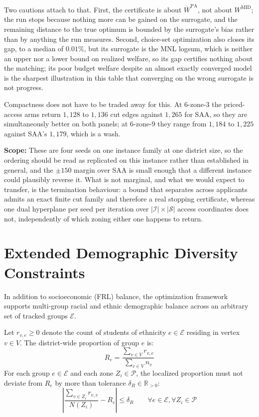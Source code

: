 \documentclass{article}
\begin{document}
Two cautions attach to that. First, the certificate is about $\overline{W}^{\mathrm{PA}}$, not about $W^{\mathrm{MID}}$; the run stops because nothing more can be gained on the surrogate, and the remaining distance to the true optimum is bounded by the surrogate's bias rather than by anything the run measures. Second, choice-set optimization also closes its gap, to a median of $0.01\%$, but its surrogate is the MNL logsum, which is neither an upper nor a lower bound on realized welfare, so its gap certifies nothing about the matching; its poor budget welfare despite an almost exactly converged model is the sharpest illustration in this table that converging on the wrong surrogate is not progress.

Compactness does not have to be traded away for this. At 6-zone-3 the priced-access arms return $1{,}128$ to $1{,}136$ cut edges against $1{,}265$ for SAA, so they are simultaneously better on both panels; at 6-zone-9 they range from $1{,}184$ to $1{,}225$ against SAA's $1{,}179$, which is a wash.

\noindent\textbf{Scope:}
These are four seeds on one instance family at one district size, so the ordering should be read as replicated on this instance rather than established in general, and the $\pm 150$ margin over SAA is small enough that a different instance could plausibly reverse it. What is not marginal, and what we would expect to transfer, is the termination behaviour: a bound that separates across applicants admits an exact finite cut family and therefore a real stopping certificate, whereas one dual hyperplane per seed per iteration over $|\mathcal{I}| \times |\mathcal{S}|$ access coordinates does not, independently of which zoning either one happens to return.

\appendix
\section{Extended Demographic Diversity Constraints}
\label{app:diversity_constraints}
In addition to socioeconomic (FRL) balance, the optimization framework supports multi-group racial and ethnic demographic balance across an arbitrary set of tracked groups $\mathcal{E}$.

Let $r_{v,e} \ge 0$ denote the count of students of ethnicity $e \in \mathcal{E}$ residing in vertex $v \in V$. The district-wide proportion of group $e$ is:
\begin{equation}
R_e = \frac{\sum_{v \in V} r_{v,e}}{\sum_{v \in V} n_v}
\end{equation}
For each group $e \in \mathcal{E}$ and each zone $Z_i \in \mathcal{P}$, the localized proportion must not deviate from $R_e$ by more than tolerance $\delta_R \in \mathbb{R}_{>0}$:
\begin{equation}
\left| \frac{\sum_{v \in Z_i} r_{v,e}}{N(Z_i)} - R_e \right| \leq \delta_R \qquad \forall e \in \mathcal{E}, \forall Z_i \in \mathcal{P}
\end{equation}
\end{document}
